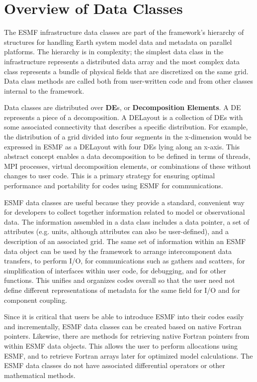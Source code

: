 
\section{Overview of Data Classes}

The ESMF infrastructure data classes are part of the framework's 
hierarchy of structures for handling Earth system model data and 
metadata on parallel platforms.  The hierarchy is in complexity; the 
simplest data class in the infrastructure represents a distributed data
array and the most complex data class represents a bundle of physical 
fields that are discretized on the same grid.  Data class methods 
are called both from user-written code and from other classes 
internal to the framework. 

Data classes are distributed over {\bf DE}s, or {\bf Decomposition Elements}.  
A DE represents a piece of a decomposition.  A DELayout is a collection
of DEs with some associated connectivity that describes a specific 
distribution.  For example, the distribution of a grid divided 
into four segments in the x-dimension would be expressed in ESMF as
a DELayout with four DEs lying along an x-axis. This abstract concept 
enables a data decomposition to be defined in 
terms of threads, MPI processes, virtual decomposition elements, or
combinations of these without changes to user code.  This is a
primary strategy for ensuring optimal performance and portability
for codes using ESMF for communications.

ESMF data classes are useful because they provide a standard, 
convenient way for developers to collect together information 
related to model or observational data.  The information assembled 
in a data class includes a data pointer, a set of attributes 
(e.g. units, although attributes can also be user-defined), and a 
description of an associated grid.  The same set of information within 
an ESMF data object can be used by the framework to arrange 
intercomponent data transfers, to perform I/O, for communications
such as gathers and scatters, for simplification of interfaces 
within user code, for debugging, and for other functions.  
This unifies and organizes codes overall so that the user need not
define different representations of metadata for the same field 
for I/O and for component coupling.  

Since it is critical that users be able to introduce ESMF into their
codes easily and incrementally, ESMF data classes can be created based 
on native Fortran pointers.  Likewise, there are methods for retrieving 
native Fortran pointers from within ESMF data objects.  This allows
the user to perform allocations using ESMF, and to retrieve Fortran
arrays later for optimized model calculations.  The ESMF data classes 
do not have associated differential operators or other mathematical 
methods.


